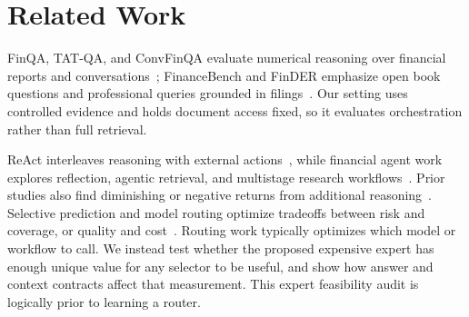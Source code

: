 \section{Related Work}

FinQA, TAT-QA, and ConvFinQA evaluate numerical reasoning over financial reports
and conversations~\cite{chen2021finqa,zhu2021tatqa,chen2022convfinqa};
FinanceBench and FinDER emphasize open book questions and professional queries
grounded in filings~\cite{islam2023financebench,choi2025finder}. Our setting
uses controlled evidence and holds document access fixed, so it evaluates
orchestration rather than full retrieval.

ReAct interleaves reasoning with external actions~\cite{yao2023react}, while
financial agent work explores reflection, agentic retrieval, and multistage
research workflows~\cite{fatemi2024reflection,choi2025finagentbench,sun2025finresearchbench}.
Prior studies also find diminishing or negative returns from additional
reasoning~\cite{chen2024donotthink,vamvourellis2025overthinking}. Selective
prediction and model routing optimize tradeoffs between risk and coverage, or
quality and cost~\cite{geifman2019selectivenet,chen2024frugalgpt,ong2025routellm}.
Routing work typically optimizes which model or workflow to call. We instead
test whether the proposed expensive expert has enough unique value for any
selector to be useful, and show how answer and context contracts affect that
measurement. This expert feasibility audit is logically prior to learning a
router.
